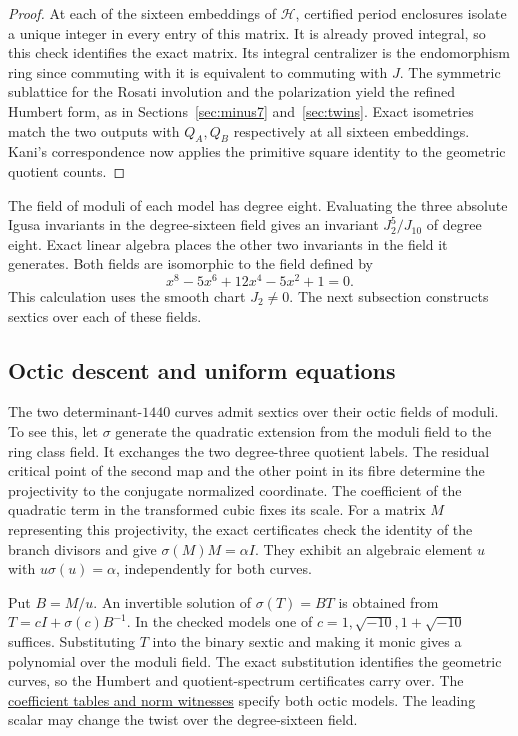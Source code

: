\documentclass[11pt,letterpaper]{amsart}
\theoremstyle{definition}
\numberwithin{equation}{section}
\begin{document}
\begin{proof}
At each of the sixteen embeddings of \(\mathcal H\), certified
period enclosures isolate a unique integer in every entry of this
matrix. It is already proved integral, so this check identifies
the exact matrix. Its integral centralizer is the endomorphism
ring since commuting with it is equivalent to commuting with
\(J\). The symmetric sublattice for the Rosati involution and
the polarization yield the refined Humbert form, as in
Sections~\ref{sec:minus7} and~\ref{sec:twins}. Exact isometries
match the two outputs with \(Q_A,Q_B\) respectively at all sixteen
embeddings. Kani's correspondence \cite{KaniI,KaniII} now applies
the primitive square identity to the geometric quotient counts.
\end{proof}

The field of moduli of each model has degree eight. Evaluating the
three absolute Igusa invariants in the degree-sixteen field gives
an invariant \(J_2^5/J_{10}\) of degree eight. Exact linear algebra
places the other two invariants in the field it generates. Both
fields are isomorphic to the field defined by
\[x^8-5x^6+12x^4-5x^2+1=0.\]
This calculation uses the smooth chart \(J_2\ne0\). The next
subsection constructs sextics over each of these fields.

\subsection{Octic descent and uniform equations}
The two determinant-\(1440\) curves admit sextics over their octic
fields of moduli. To see this, let \(\sigma\) generate the quadratic
extension from the moduli field to the ring class field. It exchanges
the two degree-three quotient labels. The residual critical point
of the second map and the other point in its fibre determine the
projectivity to the conjugate normalized coordinate. The coefficient
of the quadratic term in the transformed cubic fixes its scale. For a
matrix \(M\) representing this projectivity, the exact certificates
check the identity of the branch divisors and give
\(\sigma(M)M=\alpha I\). They exhibit an algebraic element \(u\) with
\(u\sigma(u)=\alpha\), independently for both curves.

Put \(B=M/u\). An invertible solution of \(\sigma(T)=BT\) is
obtained from \(T=cI+\sigma(c)B^{-1}\). In the checked models one of
\(c=1,\sqrt{-10},1+\sqrt{-10}\) suffices. Substituting \(T\) into
the binary sextic and making it monic gives a polynomial over the
moduli field. The exact substitution identifies the geometric curves,
so the Humbert and quotient-spectrum certificates carry over. The
\href{https://github.com/towre676-cloud/crest-root-calculus/tree/main/research/elliptic-quotients/full-spectrum-curves}{coefficient tables and norm witnesses}
specify both octic models. The leading scalar may change the twist
over the degree-sixteen field.
\end{document}
